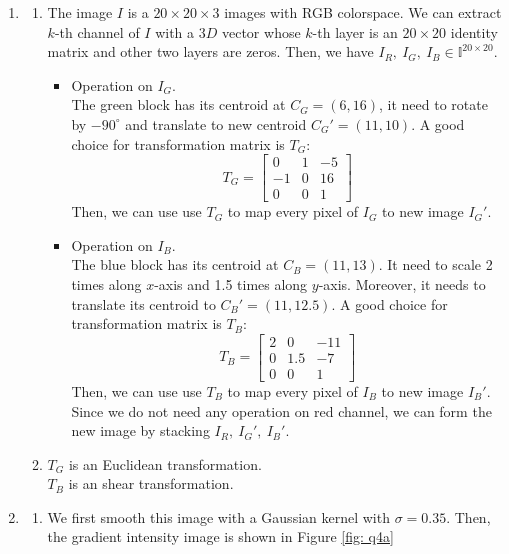 \documentclass[12pt]{article}
\begin{document}
\begin{enumerate}
	\item \begin{enumerate}
		\item The image $I$ is a $20\times20\times3$ images with RGB colorspace. We can extract $k$-th channel of $I$ with a $3D$ vector whose $k$-th layer is an $20\times20$ identity matrix and other two layers are zeros. Then, we have $I_R,~I_G,~I_B\in\mathbb{I}^{20\times20}$.
		\begin{itemize}
			\item Operation on $I_G$.\\
			The green block has its centroid at $C_G=(6,16)$, it need to rotate by $-90^\circ$ and translate to new centroid $C_G'=(11,10)$. A good choice for transformation matrix is $T_G$:
			$$T_G=\begin{bmatrix}
			0 & 1 & -5\\
			-1 & 0 & 16\\
			0 & 0 & 1
			\end{bmatrix}$$
			Then, we can use use $T_G$ to map every pixel of $I_G$ to new image $I_G'$.
			 \item Operation on $I_B$.\\
			The blue block has its centroid at $C_B=(11,13)$. It need to scale 2 times along $x$-axis and 1.5 times along $y$-axis. Moreover, it needs to translate its centroid to $C_B'=(11,12.5)$. A good choice for transformation matrix is $T_B$:
			$$T_B=\begin{bmatrix}
			2 & 0 & -11\\
			0 & 1.5 & -7\\
			0 & 0 & 1
			\end{bmatrix}$$
			Then, we can use use $T_B$ to map every pixel of $I_B$ to new image $I_B'$.
			Since we do not need any operation on red channel, we can form the new image by stacking $I_R,~I_G',~I_B'$.
		\end{itemize}
	
		\item $T_G$ is an Euclidean transformation.\\
			$T_B$ is an shear transformation.
	\end{enumerate}
	\pagebreak
	\item
	\begin{enumerate}
		\item We first smooth this image with a Gaussian kernel with $\sigma=0.35$. Then, the gradient intensity image is shown in Figure \ref{fig: q4a}
		

\end{enumerate}
\end{enumerate}
\end{document}
